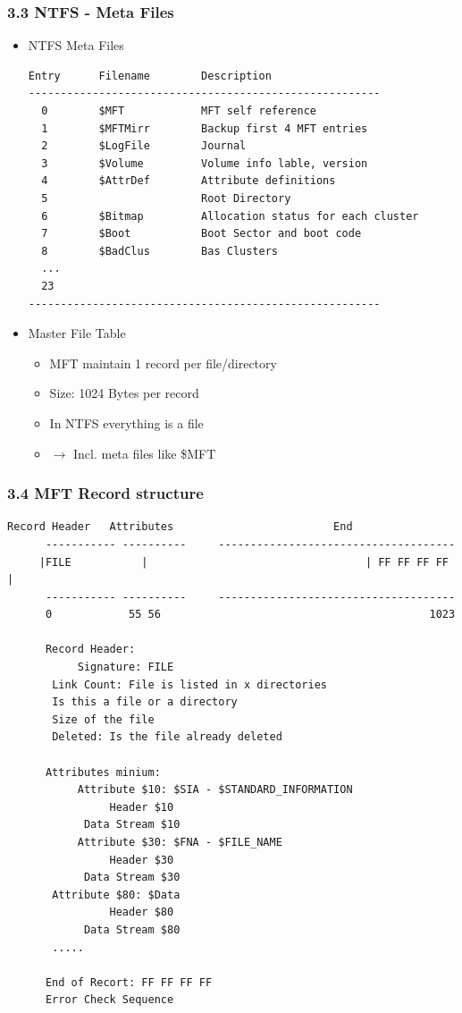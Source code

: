 \begin{frame}[fragile]
  \frametitle{3.3 NTFS - Meta Files}
    \begin{itemize}
	\item NTFS Meta Files
  \begin{lstlisting}[basicstyle=\tiny]
Entry      Filename        Description
-------------------------------------------------------
  0        $MFT            MFT self reference
  1        $MFTMirr        Backup first 4 MFT entries
  2        $LogFile        Journal
  3        $Volume         Volume info lable, version
  4        $AttrDef        Attribute definitions
  5                        Root Directory
  6        $Bitmap         Allocation status for each cluster
  7        $Boot           Boot Sector and boot code
  8        $BadClus        Bas Clusters
  ...
  23
-------------------------------------------------------
  \end{lstlisting}
    \item Master File Table
        \begin{itemize}
	    \item MFT maintain 1 record per file/directory
	    \item Size: 1024 Bytes per record
	    \item In NTFS everything is a file
	    \item[] $\to$ Incl. meta files like \$MFT
        \end{itemize}
    \end{itemize}
\end{frame}


\begin{frame}[fragile]
  \frametitle{3.4 MFT Record structure}
  \begin{lstlisting}[basicstyle=\tiny]
      Record Header   Attributes                         End     
      ----------- ----------     -------------------------------------
     |FILE           |                                  | FF FF FF FF |
      ----------- ----------     -------------------------------------
      0            55 56                                          1023

      Record Header:
           Signature: FILE
	   Link Count: File is listed in x directories
	   Is this a file or a directory
	   Size of the file
	   Deleted: Is the file already deleted

      Attributes minium:
           Attribute $10: $SIA - $STANDARD_INFORMATION
                Header $10
	        Data Stream $10
           Attribute $30: $FNA - $FILE_NAME
                Header $30
	        Data Stream $30
	   Attribute $80: $Data
                Header $80
	        Data Stream $80
	   .....

      End of Recort: FF FF FF FF
      Error Check Sequence
  \end{lstlisting}
\end{frame}


